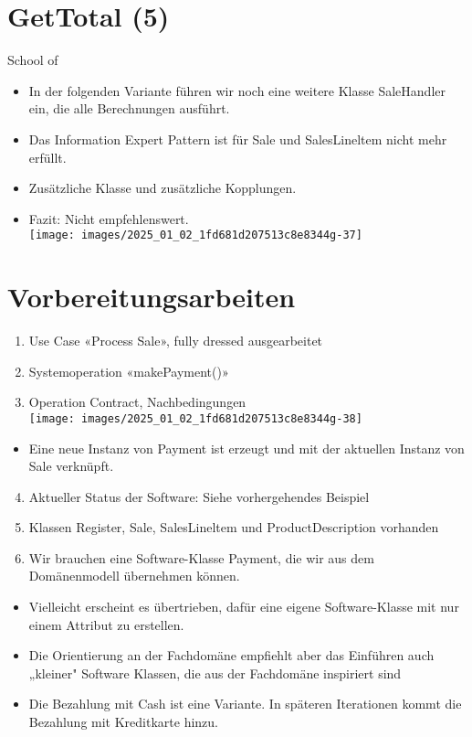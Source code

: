 \documentclass[10pt]{article}
\begin{document}
\section*{GetTotal (5)}
School of

\begin{itemize}
  \item In der folgenden Variante führen wir noch eine weitere Klasse SaleHandler ein, die alle Berechnungen ausführt.
  \item Das Information Expert Pattern ist für Sale und SalesLineltem nicht mehr erfüllt.
  \item Zusätzliche Klasse und zusätzliche Kopplungen.
  \item Fazit: Nicht empfehlenswert.\\
\texttt{[image: images/2025\_01\_02\_1fd681d207513c8e8344g-37]}
\end{itemize}

\section*{Vorbereitungsarbeiten}
\begin{enumerate}
  \item Use Case «Process Sale», fully dressed ausgearbeitet
  \item Systemoperation «makePayment()»
  \item Operation Contract, Nachbedingungen\\
\texttt{[image: images/2025\_01\_02\_1fd681d207513c8e8344g-38]}
\end{enumerate}

\begin{itemize}
  \item Eine neue Instanz von Payment ist erzeugt und mit der aktuellen Instanz von Sale verknüpft.
\end{itemize}

\begin{enumerate}
  \setcounter{enumi}{3}
  \item Aktueller Status der Software: Siehe vorhergehendes Beispiel
  \item Klassen Register, Sale, SalesLineltem und ProductDescription vorhanden
  \item Wir brauchen eine Software-Klasse Payment, die wir aus dem Domänenmodell übernehmen können.
\end{enumerate}

\begin{itemize}
  \item Vielleicht erscheint es übertrieben, dafür eine eigene Software-Klasse mit nur einem Attribut zu erstellen.
  \item Die Orientierung an der Fachdomäne empfiehlt aber das Einführen auch „kleiner" Software Klassen, die aus der Fachdomäne inspiriert sind
  \item Die Bezahlung mit Cash ist eine Variante. In späteren Iterationen kommt die Bezahlung mit Kreditkarte hinzu.
\end{itemize}
\end{document}
